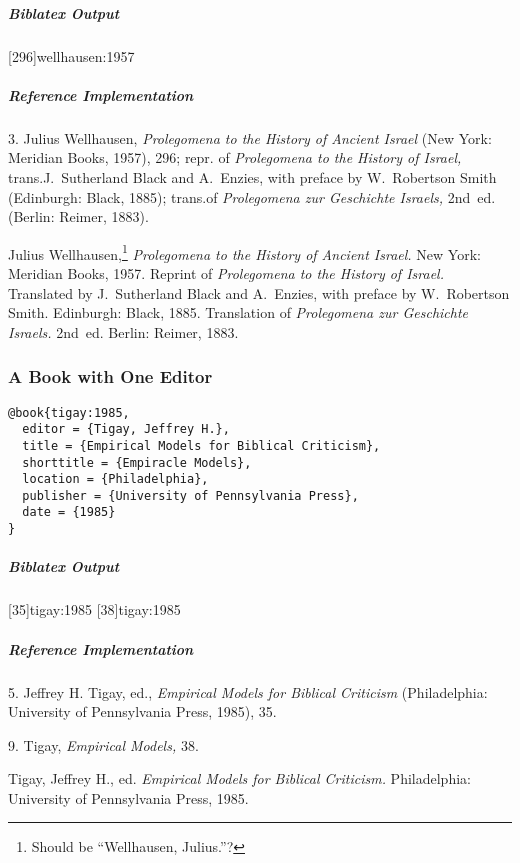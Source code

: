 \documentclass[a4paper]{article}
\newenvironment{biboutput}{%
  \subparagraph{Biblatex Output}
}{\color{black}}
\newenvironment{refimp}{%
  \subparagraph{Reference Implementation}
  \color{reference-colour}
  \rm
}{\par\color{black}}
\begin{document}
\begin{biboutput}
  \sloppy{}[296]{wellhausen:1957}
\end{biboutput}

\begin{refimp}
  \hspace*{\bibindent}3. Julius Wellhausen, \emph{Prolegomena to the History
  of Ancient Israel} (New York: Meridian Books, 1957), 296; repr. of
  \emph{Prolegomena to the History of Israel,} trans.\@ J.~Sutherland Black and
  A.~Enzies, with preface by W.~Robertson Smith (Edinburgh: Black, 1885);
  trans.\@ of \emph{Prolegomena zur Geschichte Israels,} 2nd~ed. (Berlin:
  Reimer, 1883).

  \hangindent\bibindent Julius Wellhausen,\footnote{Should be “Wellhausen,
  Julius.”?} \emph{Prolegomena to the History of Ancient Israel.} New York:
  Meridian Books, 1957. Reprint of \emph{Prolegomena to the History of
  Israel.} Translated by J.~Sutherland Black and A.~Enzies, with preface by
  W.~Robertson Smith. Edinburgh: Black, 1885. Translation of \emph{Prolegomena
  zur Geschichte Israels.} 2nd~ed. Berlin: Reimer, 1883.
\end{refimp}

\subsubsection{A Book with One Editor}

\begin{lstlisting}
@book{tigay:1985,
  editor = {Tigay, Jeffrey H.},
  title = {Empirical Models for Biblical Criticism},
  shorttitle = {Empiracle Models},
  location = {Philadelphia},
  publisher = {University of Pennsylvania Press},
  date = {1985}
}
\end{lstlisting}  

\begin{biboutput}
  [35]{tigay:1985}
  [38]{tigay:1985}
\end{biboutput}

\begin{refimp}
  \hspace*{\bibindent}5. Jeffrey H. Tigay, ed., \emph{Empirical Models for
  Biblical Criticism} (Philadelphia: University of Pennsylvania Press, 1985),
  35.

  \hspace*{\bibindent}9. Tigay, \emph{Empirical Models,} 38.

  \hangindent\bibindent Tigay, Jeffrey H., ed. \emph{Empirical Models for
  Biblical Criticism.} Philadelphia: University of Pennsylvania Press,
  1985.
\end{refimp}
\end{document}
